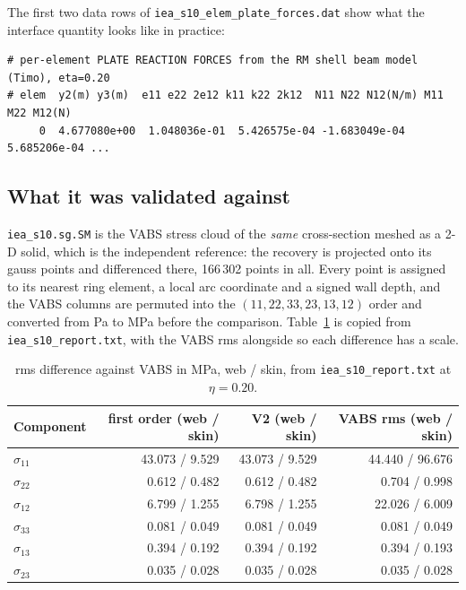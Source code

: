 The first two data rows of \texttt{iea\_s10\_elem\_plate\_forces.dat} show what
the interface quantity looks like in practice:

\begin{lstlisting}[style=shellst,basicstyle=\ttfamily\footnotesize]
# per-element PLATE REACTION FORCES from the RM shell beam model (Timo), eta=0.20
# elem  y2(m) y3(m)  e11 e22 2e12 k11 k22 2k12  N11 N22 N12(N/m) M11 M22 M12(N)
     0  4.677080e+00  1.048036e-01  5.426575e-04 -1.683049e-04  5.685206e-04 ...
\end{lstlisting}

\subsection*{What it was validated against}

\texttt{iea\_s10.sg.SM} is the VABS stress cloud of the \emph{same}
cross-section meshed as a 2-D solid, which is the independent reference: the
recovery is projected onto its gauss points and differenced there, 166\,302
points in all. Every point is assigned to its nearest ring element, a local arc
coordinate and a signed wall depth, and the VABS columns are permuted into the
$(11, 22, 33, 23, 13, 12)$ order and converted from Pa to MPa before the
comparison. Table~\ref{tab:windio:vabs} is copied from
\texttt{iea\_s10\_report.txt}, with the VABS rms alongside so each difference
has a scale.

\begin{table}[htbp]
\centering
\small
\caption{rms difference against VABS in MPa, web / skin, from
         \texttt{iea\_s10\_report.txt} at $\eta = 0.20$.}
\label{tab:windio:vabs}
\begin{tabular}{lrrr}
\toprule
Component & first order (web / skin) & V2 (web / skin) & VABS rms (web / skin) \\
\midrule
$\sigma_{11}$ & 43.073 / 9.529 & 43.073 / 9.529 & 44.440 / 96.676 \\
$\sigma_{22}$ & 0.612 / 0.482 & 0.612 / 0.482 & 0.704 / 0.998 \\
$\sigma_{12}$ & 6.799 / 1.255 & 6.798 / 1.255 & 22.026 / 6.009 \\
$\sigma_{33}$ & 0.081 / 0.049 & 0.081 / 0.049 & 0.081 / 0.049 \\
$\sigma_{13}$ & 0.394 / 0.192 & 0.394 / 0.192 & 0.394 / 0.193 \\
$\sigma_{23}$ & 0.035 / 0.028 & 0.035 / 0.028 & 0.035 / 0.028 \\
\bottomrule
\end{tabular}
\end{table}

